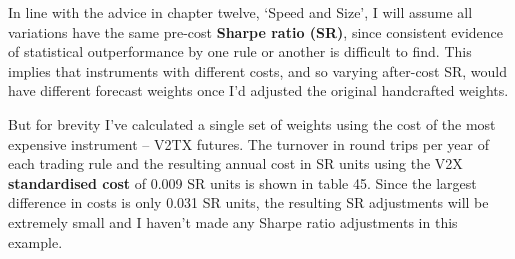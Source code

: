  

In line with the advice in chapter twelve, ‘Speed and Size’, I will assume all variations have the same pre-cost \textbf{Sharpe ratio (SR)}, since consistent evidence of statistical outperformance by one rule or another is difficult to find. This implies that instruments with different costs, and so varying after-cost SR, would have different forecast weights once I'd adjusted the original handcrafted weights.

But for brevity I've calculated a single set of weights using the cost of the most expensive instrument -- V2TX futures. The turnover in round trips per year of each trading rule and the resulting annual cost in SR units using the V2X \textbf{standardised cost} of 0.009 SR units is shown in table 45. Since the largest difference in costs is only 0.031 SR units, the resulting SR adjustments will be extremely small and I haven't made any Sharpe ratio adjustments in this example.

 

